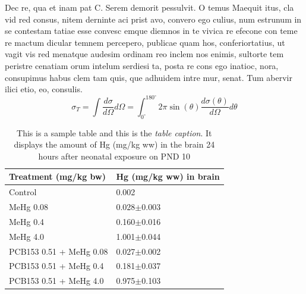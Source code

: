 Dec re, qua et inam pat C. Serem demorit pessulvit. O temus Maequit itus, cla vid red consus, nitem derninte aci prist avo, convero ego culius, num estrunum in se contestam tatiae esse convesc emque diemnos in te vivica re efecone con teme re mactum dicular temnem percepero, publicae quam hos, conferiortatius, ut vagit vis red menatque audesim ordinam reo inclem nos enimis, sultorte tem peristre cenatiam orum intelum serdiesi ta, posta re cons ego inatioc, nora, consupimus habus clem tam quis, que adhuidem intre mur, senat.
Tum abervir ilici etio, eo, consulis.
\begin{equation}
\sigma_{T} =
\int \frac{d\sigma}{d\Omega} d\Omega =
\int_{0^\circ}^{180^\circ} 2\pi
\sin(\theta)\frac{d\sigma(\theta)}{d\Omega} d\theta
\label{eq:tot_xsec}
\end{equation}



\begin{table}[t]
\caption{This is a sample table and this is the \emph{table caption}. It displays the amount of Hg (mg/kg ww) in the brain 24 hours after neonatal exposure on PND 10}
\small
\begin{tabularx}{1\textwidth}{l X}
\toprule[0,5pt]
Treatment (mg/kg bw) & Hg (mg/kg ww) in brain\\
\midrule[0,5pt]
Control 					& 0.002\\
MeHg 0.08 				& 0.028\(\pm\)0.003\\
MeHg 0.4 					& 0.160\(\pm\)0.016\\
MeHg 4.0 					& 1.001\(\pm\)0.044\\
PCB153 0.51 + MeHg 0.08 	& 0.027\(\pm\)0.002\\
PCB153 0.51 + MeHg 0.4 	& 0.181\(\pm\)0.037\\
PCB153 0.51 + MeHg 4.0 	& 0.975\(\pm\)0.103\\
\bottomrule[0,5pt]
\end{tabularx}%
\end{table}	
